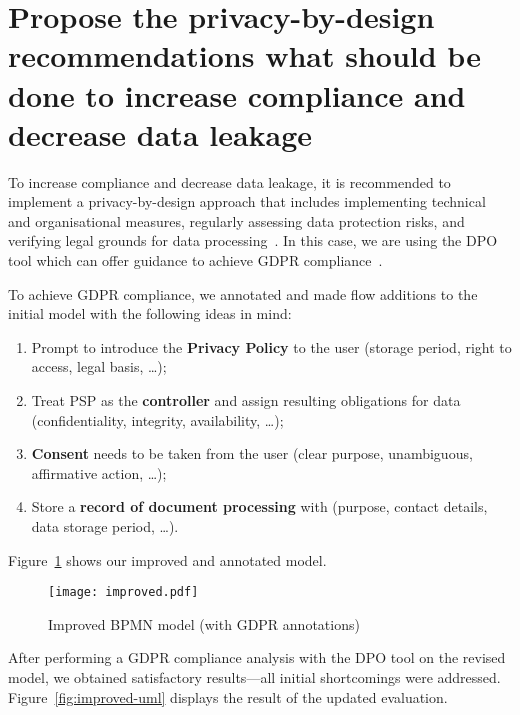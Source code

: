 \section{Propose the privacy-by-design recommendations what should be done to
increase compliance and decrease data leakage}

To increase compliance and decrease data leakage, it is recommended to implement
a privacy-by-design approach that includes implementing technical and
organisational measures, regularly assessing data protection risks, and
verifying legal grounds for data
processing~\cite[110-111]{10.1007/978-3-030-58135-0_9}. In this case, we are
using the DPO tool which can offer guidance to achieve GDPR
compliance~\cite{dpotool}.

To achieve GDPR compliance, we annotated and made flow additions to the initial
model with the following ideas in mind:
\begin{enumerate}
  \item Prompt to introduce the \textbf{Privacy Policy} to the user (storage
  period, right to access, legal basis, \dots);
  \item Treat PSP as the \textbf{controller} and assign resulting obligations
  for data (confidentiality, integrity, availability, \dots);
  \item \textbf{Consent} needs to be taken from the user (clear purpose,
  unambiguous, affirmative action, \dots);
  \item Store a \textbf{record of document processing} with (purpose, contact
  details, data storage period, \dots).
\end{enumerate}

Figure~\ref{fig:improved-model} shows our improved and annotated model.

\begin{landscape}

\begin{figure}[ht]
\begin{center}
  \texttt{[image: improved.pdf]}
  \caption{Improved BPMN model (with GDPR annotations)}
  \label{fig:improved-model}
\end{center}
\end{figure}

\end{landscape}

After performing a GDPR compliance analysis with the DPO tool on the revised
model, we obtained satisfactory results---all initial shortcomings were
addressed. Figure~\ref{fig:improved-uml} displays the result of the updated
evaluation.

